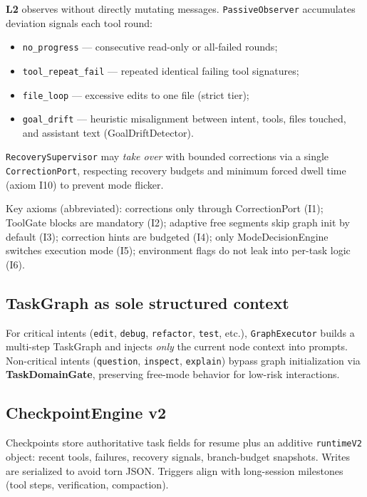 \documentclass[11pt,a4paper]{article}
\begin{document}
\textbf{L2} observes without directly mutating messages.
\texttt{PassiveObserver} accumulates deviation signals each tool round:
\begin{itemize}[nosep]
  \item \texttt{no\_progress} --- consecutive read-only or all-failed rounds;
  \item \texttt{tool\_repeat\_fail} --- repeated identical failing tool signatures;
  \item \texttt{file\_loop} --- excessive edits to one file (strict tier);
  \item \texttt{goal\_drift} --- heuristic misalignment between intent, tools, files touched, and assistant text (GoalDriftDetector).
\end{itemize}
\texttt{RecoverySupervisor} may \emph{take over} with bounded corrections via a single \texttt{CorrectionPort}, respecting recovery budgets and minimum forced dwell time (axiom I10) to prevent mode flicker.

Key axioms (abbreviated): corrections only through CorrectionPort (I1); ToolGate blocks are mandatory (I2); adaptive free segments skip graph init by default (I3); correction hints are budgeted (I4); only ModeDecisionEngine switches execution mode (I5); environment flags do not leak into per-task logic (I6).

\subsection{TaskGraph as sole structured context}

For critical intents (\texttt{edit}, \texttt{debug}, \texttt{refactor}, \texttt{test}, etc.), \texttt{GraphExecutor} builds a multi-step TaskGraph and injects \emph{only} the current node context into prompts.
Non-critical intents (\texttt{question}, \texttt{inspect}, \texttt{explain}) bypass graph initialization via \textbf{TaskDomainGate}, preserving free-mode behavior for low-risk interactions.

\subsection{CheckpointEngine v2}

Checkpoints store authoritative task fields for resume plus an additive \texttt{runtimeV2} object: recent tools, failures, recovery signals, branch-budget snapshots.
Writes are serialized to avoid torn JSON.
Triggers align with long-session milestones (tool steps, verification, compaction).
\end{document}
